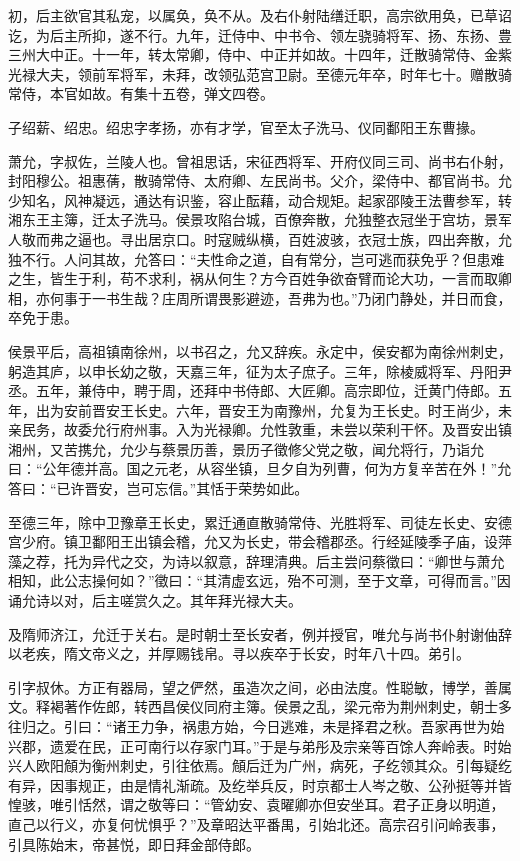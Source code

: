 \documentclass[]{article}
\begin{document}
初，后主欲官其私宠，以属奂，奂不从。及右仆射陆缮迁职，高宗欲用奂，已草诏讫，为后主所抑，遂不行。九年，迁侍中、中书令、领左骁骑将军、扬、东扬、豊三州大中正。十一年，转太常卿，侍中、中正并如故。十四年，迁散骑常侍、金紫光禄大夫，领前军将军，未拜，改领弘范宫卫尉。至德元年卒，时年七十。赠散骑常侍，本官如故。有集十五卷，弹文四卷。

子绍薪、绍忠。绍忠字孝扬，亦有才学，官至太子洗马、仪同鄱阳王东曹掾。

萧允，字叔佐，兰陵人也。曾祖思话，宋征西将军、开府仪同三司、尚书右仆射，封阳穆公。祖惠蒨，散骑常侍、太府卿、左民尚书。父介，梁侍中、都官尚书。允少知名，风神凝远，通达有识鉴，容止酝藉，动合规矩。起家邵陵王法曹参军，转湘东王主簿，迁太子洗马。侯景攻陷台城，百僚奔散，允独整衣冠坐于宫坊，景军人敬而弗之逼也。寻出居京口。时寇贼纵横，百姓波骇，衣冠士族，四出奔散，允独不行。人问其故，允答曰：``夫性命之道，自有常分，岂可逃而获免乎？但患难之生，皆生于利，苟不求利，祸从何生？方今百姓争欲奋臂而论大功，一言而取卿相，亦何事于一书生哉？庄周所谓畏影避迹，吾弗为也。''乃闭门静处，并日而食，卒免于患。

侯景平后，高祖镇南徐州，以书召之，允又辞疾。永定中，侯安都为南徐州刺史，躬造其庐，以申长幼之敬，天嘉三年，征为太子庶子。三年，除棱威将军、丹阳尹丞。五年，兼侍中，聘于周，还拜中书侍郎、大匠卿。高宗即位，迁黄门侍郎。五年，出为安前晋安王长史。六年，晋安王为南豫州，允复为王长史。时王尚少，未亲民务，故委允行府州事。入为光禄卿。允性敦重，未尝以荣利干怀。及晋安出镇湘州，又苦携允，允少与蔡景历善，景历子徵修父党之敬，闻允将行，乃诣允曰：``公年德并高。国之元老，从容坐镇，旦夕自为列曹，何为方复辛苦在外！''允答曰：``已许晋安，岂可忘信。''其恬于荣势如此。

至德三年，除中卫豫章王长史，累迁通直散骑常侍、光胜将军、司徒左长史、安德宫少府。镇卫鄱阳王出镇会稽，允又为长史，带会稽郡丞。行经延陵季子庙，设萍藻之荐，托为异代之交，为诗以叙意，辞理清典。后主尝问蔡徵曰：``卿世与萧允相知，此公志操何如？''徵曰：``其清虚玄远，殆不可测，至于文章，可得而言。''因诵允诗以对，后主嗟赏久之。其年拜光禄大夫。

及隋师济江，允迁于关右。是时朝士至长安者，例并授官，唯允与尚书仆射谢伷辞以老疾，隋文帝义之，并厚赐钱帛。寻以疾卒于长安，时年八十四。弟引。

引字叔休。方正有器局，望之俨然，虽造次之间，必由法度。性聪敏，博学，善属文。释褐著作佐郎，转西昌侯仪同府主簿。侯景之乱，梁元帝为荆州刺史，朝士多往归之。引曰：``诸王力争，祸患方始，今日逃难，未是择君之秋。吾家再世为始兴郡，遗爱在民，正可南行以存家门耳。''于是与弟彤及宗亲等百馀人奔岭表。时始兴人欧阳頠为衡州刺史，引往依焉。頠后迁为广州，病死，子纥领其众。引每疑纥有异，因事规正，由是情礼渐疏。及纥举兵反，时京都士人岑之敬、公孙挺等并皆惶骇，唯引恬然，谓之敬等曰：``管幼安、袁曜卿亦但安坐耳。君子正身以明道，直己以行义，亦复何忧惧乎？''及章昭达平番禺，引始北还。高宗召引问岭表事，引具陈始末，帝甚悦，即日拜金部侍郎。
\end{document}

